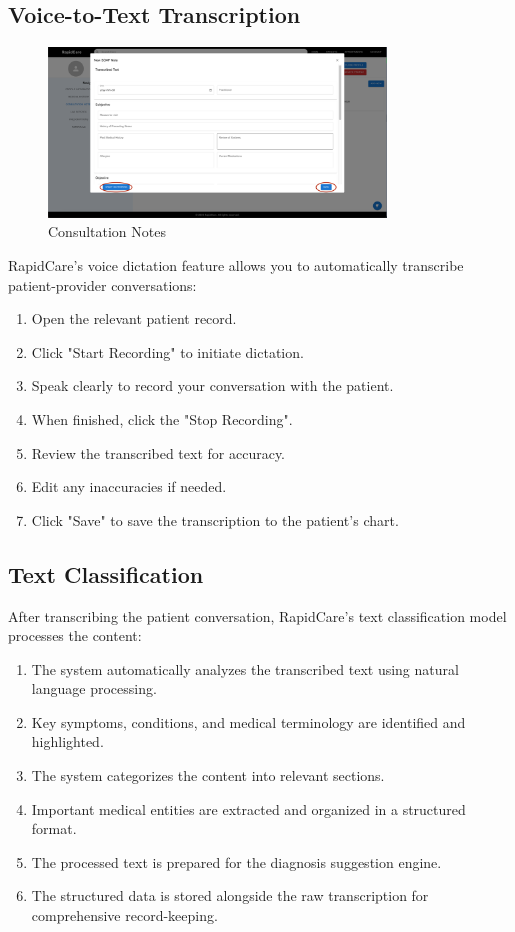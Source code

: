 \documentclass[12pt, titlepage]{article}
\begin{document}
\subsection{Voice-to-Text Transcription}

\begin{figure}[H]
\centering
\includegraphics[width=0.8\textwidth]{vtt.png}
\caption{Consultation Notes}
\label{fig:Consultation Notes}
\end{figure}

RapidCare's voice dictation feature allows you to automatically transcribe patient-provider conversations:

\begin{enumerate}
\item Open the relevant patient record.
\item Click "Start Recording" to initiate dictation.
\item Speak clearly to record your conversation with the patient.
\item When finished, click the "Stop Recording".
\item Review the transcribed text for accuracy.
\item Edit any inaccuracies if needed.
\item Click "Save" to save the transcription to the patient's chart.
\end{enumerate}

\subsection{Text Classification}
After transcribing the patient conversation, RapidCare's text classification model processes the content:
\begin{enumerate}
\item The system automatically analyzes the transcribed text using natural language processing.
\item Key symptoms, conditions, and medical terminology are identified and highlighted.
\item The system categorizes the content into relevant sections.
\item Important medical entities are extracted and organized in a structured format.
\item The processed text is prepared for the diagnosis suggestion engine.
\item The structured data is stored alongside the raw transcription for comprehensive record-keeping.
\end{enumerate}
\end{document}
